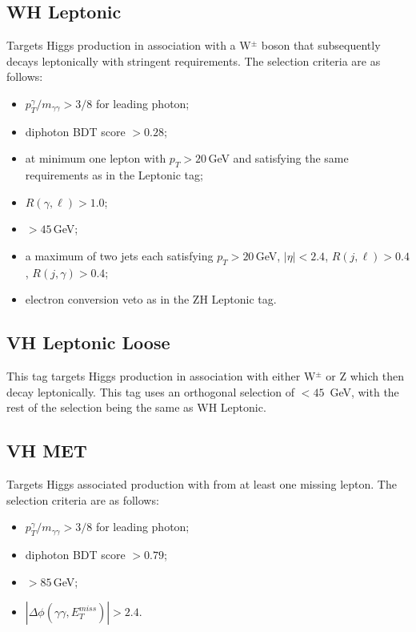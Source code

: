 \subsection{WH Leptonic}
Targets Higgs production in association with a W$^{\pm}$ boson that subsequently decays leptonically with stringent requirements. The selection criteria are as follows:
\begin{itemize}[noitemsep]
    \item $p^{\gamma}_{T}/m_{\gamma\gamma} > 3/8$ for leading photon;
    \item diphoton BDT score $> 0.28$;
    \item at minimum one lepton with $p_T > 20$\,GeV and satisfying the same requirements as in the \ttH Leptonic tag;
    \item $R(\gamma,\ell) > 1.0$;
    \item \MET$> 45$\,GeV;
    \item a maximum of two jets each satisfying $p_T > 20$\,GeV, $|\eta| < 2.4$, $R(j,\ell) > 0.4$, $R(j,\gamma) > 0.4$;
    \item electron conversion veto as in the ZH Leptonic tag.
\end{itemize}



\subsection{VH Leptonic Loose}
This tag targets Higgs production in association with either W$^{\pm}$ or Z which then decay leptonically. 
This tag uses an orthogonal \MET selection of \MET$ < 45$\, GeV, with the rest of the selection being the same as WH Leptonic.

\subsection{VH MET}
Targets Higgs associated production with \MET from at least one missing lepton. The selection criteria are as follows:
\begin{itemize}[noitemsep]
    \item $p^{\gamma}_{T}/m_{\gamma\gamma} > 3/8$ for leading photon;
    \item diphoton BDT score $> 0.79$;
    \item \MET$> 85$\,GeV;
    \item $|\Delta\phi(\gamma\gamma,E_{T}^{miss})| > 2.4$.
\end{itemize}


